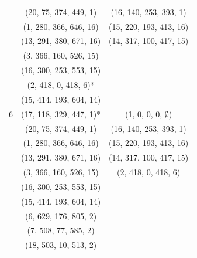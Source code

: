 \documentclass[a4paper, 11pt]{article}
\begin{document}
\begin{center}
\begin{tabular}{ |c|c|c| }
      & (20, 75, 374, 449, 1) & (16, 140, 253, 393, 1)\\
      & (1, 280, 366, 646, 16) & (15, 220, 193, 413, 16)\\
      & (13, 291, 380, 671, 16) & (14, 317, 100, 417, 15)\\
      & (3, 366, 160, 526, 15) & \\
      & (16, 300, 253, 553, 15) & \\
      & (2, 418, 0, 418, 6)* & \\
      & (15, 414, 193, 604, 14) & \\
    \hline
      6 & (17, 118, 329, 447, 1)* & (1, 0, 0, 0, $\emptyset$)\\
      & (20, 75, 374, 449, 1) & (16, 140, 253, 393, 1)\\
      & (1, 280, 366, 646, 16) & (15, 220, 193, 413, 16)\\
      & (13, 291, 380, 671, 16) & (14, 317, 100, 417, 15)\\
      & (3, 366, 160, 526, 15) & (2, 418, 0, 418, 6)\\
      & (16, 300, 253, 553, 15) & \\
      & (15, 414, 193, 604, 14) & \\
      & (6, 629, 176, 805, 2)& \\
      & (7, 508, 77, 585, 2) & \\
      & (18, 503, 10, 513, 2) & \\
    \hline
  \end{tabular}
\end{center}
\end{document}
